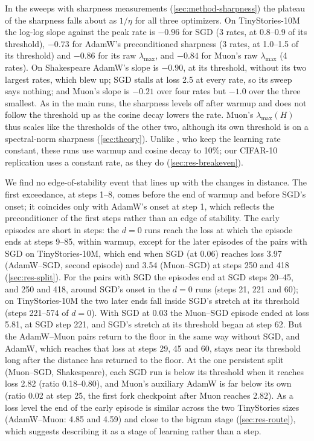 \documentclass[10pt]{article}
\makeatletter
\renewcommand\paragraph{\@startsection{paragraph}{4}{\z@}{1.2ex \@plus .4ex \@minus .2ex}{-1em}{\normalfont\normalsize\bfseries}}
\newcommand{\extra}{\textsuperscript{\dag}}  %
\newcommand{\lmax}{\lambda_{\max}}
\makeatother
\begin{document}
\paragraph{Across learning rates.\extra} In the sweeps with sharpness measurements
(\cref{sec:method-sharpness}) the plateau of the sharpness falls about as $1/\eta$ for all three optimizers. On
TinyStories-10M the log-log slope against the peak rate is $-0.96$ for SGD (3 rates, at 0.8--0.9 of its
threshold), $-0.73$ for AdamW's preconditioned sharpness (3 rates, at 1.0--1.5 of its threshold) and $-0.86$ for
its raw $\lmax$, and $-0.84$ for Muon's raw $\lmax$ (4 rates). On Shakespeare AdamW's slope is $-0.90$, at its
threshold, without its two largest rates, which blew up; SGD stalls at loss 2.5 at every rate, so its sweep says
nothing; and Muon's slope is $-0.21$ over four rates but $-1.0$ over the three smallest. As in the main runs, the
sharpness levels off after warmup and does not follow the threshold up as the cosine decay lowers the rate.
Muon's $\lmax(H)$ thus scales like the thresholds of the other two, although its own threshold is on a
spectral-norm sharpness (\cref{sec:theory}). Unlike \citet{jastrzebski2020breakeven}, who keep the learning
rate constant, these runs use warmup and cosine decay to 10\%; our CIFAR-10 replication uses a constant rate, as
they do (\cref{sec:res-breakeven}).

\paragraph{Coincidences.} We find no edge-of-stability event that lines up with the changes in distance. The first exceedance,
at steps 1--8, comes before the end of warmup and before SGD's onset; it coincides only with AdamW's onset at
step 1, which reflects the preconditioner of the first steps rather than an edge of stability. The early
episodes are short in steps: the $d=0$ runs reach the loss at which the episode ends at steps 9--85, within warmup,
except for the later episodes of the pairs with SGD on TinyStories-10M, which end when SGD (at 0.06) reaches loss 3.97
(AdamW--SGD, second episode) and 3.54 (Muon--SGD) at steps 250 and 418 (\cref{sec:res-split}). For the pairs with SGD
the episodes end at SGD steps 20--45, and 250 and 418, around SGD's onset in the $d=0$ runs (steps 21, 221 and 60);
on TinyStories-10M the two later ends fall inside SGD's stretch at its threshold (steps 221--574 of $d=0$). With SGD at
0.03 the Muon--SGD episode ended at loss 5.81, at SGD step 221, and SGD's stretch at its threshold began at step 62. But the
AdamW--Muon pairs return to the floor in the same way without SGD, and AdamW, which reaches that loss at steps
29, 45 and 60, stays near its threshold long after the distance has returned to the floor. At the one persistent
split (Muon--SGD, Shakespeare), each SGD run is below its threshold when it reaches loss 2.82 (ratio
0.18--0.80), and Muon's auxiliary AdamW is far below its own (ratio 0.02 at step 25, the first fork checkpoint
after Muon reaches 2.82). As a loss level the end of the early episode is similar across the two TinyStories
sizes (AdamW--Muon: 4.85 and 4.59) and close to the bigram stage (\cref{sec:res-route}), which suggests
describing it as a stage of learning rather than a step.
\end{document}
